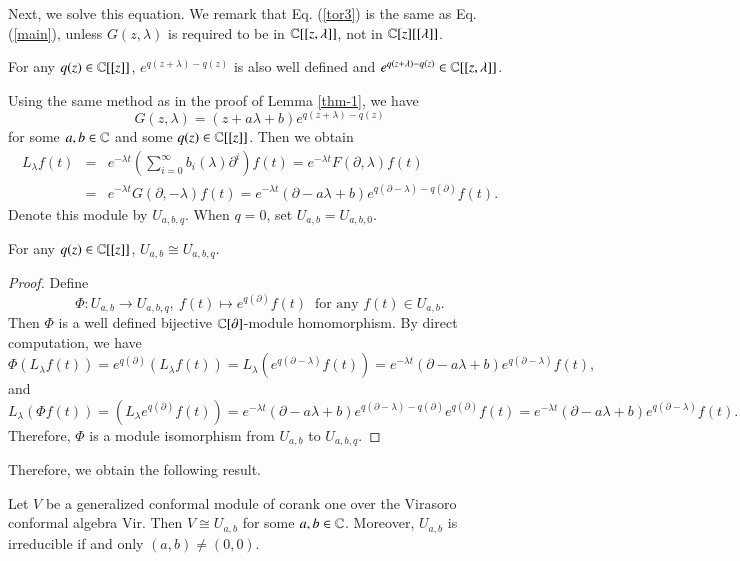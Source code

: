 \documentclass[12pt]{amsart}
\begin{document}
Next, we solve this equation.
 We remark that Eq. (\ref{tor3}) is the same as
Eq. (\ref{main}), unless $G(z,\lambda)$ is required to be in $\mathbb{C}[[z,\lambda]]$, not in $\mathbb{C}[z][[\lambda]]$.
\begin{rmk}
For any $q(z)\in \mathbb{C}[[z]]$, %
$e^{q(z+\lambda)-q(z)}$ is also
well defined and $e^{q(z+\lambda)-q(z)}\in\mathbb{C}[[z,\lambda]]$.
\end{rmk}
Using the same method as in the proof of Lemma \ref{thm-1}, we have
$$G(z, \lambda)=(z+a \lambda+b)e^{q(z+\lambda)-q(z)}$$ for some $a,b\in\mathbb{C}$ and some $q(z)\in\mathbb{C}[[z]]$.
Then we obtain
\begin{eqnarray*}
L_\lambda f(t)&=&e^{-\lambda t}(\sum_{i=0}^\infty b_i(\lambda)\partial^i) f(t)=e^{-\lambda t}F(\partial,\lambda)f(t)\\
&=&e^{-\lambda t}G(\partial,-\lambda)f(t)=e^{-\lambda t}(\partial-a \lambda+b)e^{q(\partial-\lambda)-q(\partial)}f(t).
\end{eqnarray*}
Denote this module by $U_{a,b,q}$. %
When $q=0$, set $U_{a,b}=U_{a,b,0}$.
\begin{lem}For any $q(z)\in\mathbb{C}[[z]]$,
$U_{a,b}\cong U_{a,b,q}$.
\end{lem}
\begin{proof}
Define $$\Phi:U_{a,b}\rightarrow U_{a,b,q},\ f(t)\mapsto e^{q(\partial)}f(t)\;\; \text{for any $f(t)\in U_{a,b}$.}$$ Then $\Phi$ is a well defined bijective $\mathbb{C}[\partial]$-module homomorphism.
By  direct computation, we have
\[
\Phi(L_\lambda f(t))=e^{q(\partial)}(L_\lambda f(t))=L_\lambda (e^{q(\partial-\lambda)}f(t))=e^{-\lambda t}(\partial-a \lambda+b)e^{q(\partial-\lambda)}f(t),
\]
and
\[
L_\lambda (\Phi f(t))=(L_\lambda e^{q(\partial)}f(t))=e^{-\lambda t}(\partial-a \lambda+b)e^{q(\partial-\lambda)-q(\partial)}e^{q(\partial)}f(t)=e^{-\lambda t}(\partial-a \lambda+b)e^{q(\partial-\lambda)}f(t).
\]
Therefore, $\Phi$ is a module isomorphism from $U_{a,b}$ to $U_{a,b,q}$.
\end{proof}
Therefore, we obtain the following result.
\begin{thm}\label{thm-6}
Let $V$ be a generalized conformal module of corank one over the Virasoro conformal algebra Vir. Then $V\cong U_{a,b}$ for some $a,b\in\mathbb{C}$. Moreover, $U_{a,b}$ is irreducible if and only $(a,b)\neq (0,0)$.
\end{thm}
\end{document}
